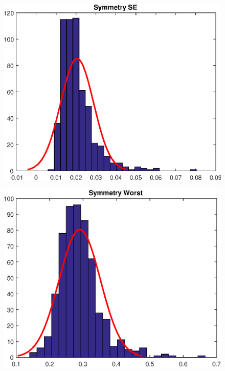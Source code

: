 \documentclass[11pt,a4paper]{article}
\numberwithin{equation}{section}
\begin{document}
\begin{itemize}
\begin{figure}[H]
\centering
\begin{minipage}{.5\textwidth}
  \centering
  \includegraphics[width=\linewidth]{./img/symmetry_se}
  \label{fig:test1}
\end{minipage}%
\begin{minipage}{.5\textwidth}
  \centering
  \includegraphics[width=\linewidth]{./img/symmetry_worst}
  \label{fig:test2}
\end{minipage}
\end{figure}


\end{itemize}
\end{document}
